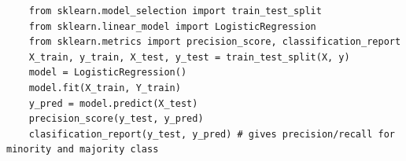 \documentclass{article}
\begin{document}
\begin{verbatim}
    from sklearn.model_selection import train_test_split
    from sklearn.linear_model import LogisticRegression
    from sklearn.metrics import precision_score, classification_report
    X_train, y_train, X_test, y_test = train_test_split(X, y)
    model = LogisticRegression()
    model.fit(X_train, Y_train)
    y_pred = model.predict(X_test)
    precision_score(y_test, y_pred)   
    clasification_report(y_test, y_pred) # gives precision/recall for minority and majority class
\end{verbatim}
\end{document}
